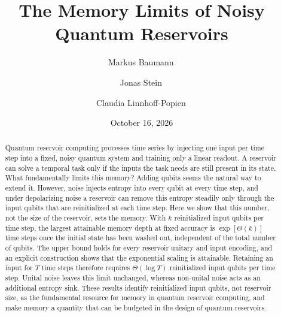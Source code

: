 \documentclass[aps,pra,reprint,superscriptaddress,floatfix]{revtex4-2}
\theoremstyle{plain}
\begin{document}
\raggedbottom

\title{The Memory Limits of Noisy Quantum Reservoirs}

\author{Markus Baumann\,}
\author{Jonas Stein\,}
\author{Claudia Linnhoff-Popien\,}

\date{October 16, 2026}

\begin{abstract}
Quantum reservoir computing processes time series by injecting one input per time step into a fixed, noisy quantum system and training only a linear readout. A reservoir can solve a temporal task only if the inputs the task needs are still present in its state. What fundamentally limits this memory? Adding qubits seems the natural way to extend it. However, noise injects entropy into every qubit at every time step, and under depolarizing noise a reservoir can remove this entropy steadily only through the input qubits that are reinitialized at each time step. Here we show that this number, not the size of the reservoir, sets the memory. With $k$ reinitialized input qubits per time step, the largest attainable memory depth at fixed accuracy is $\exp[\Theta(k)]$ time steps once the initial state has been washed out, independent of the total number of qubits. The upper bound holds for every reservoir unitary and input encoding, and an explicit construction shows that the exponential scaling is attainable. Retaining an input for $T$ time steps therefore requires $\Theta(\log T)$ reinitialized input qubits per time step. Unital noise leaves this limit unchanged, whereas non-unital noise acts as an additional entropy sink. These results identify reinitialized input qubits, not reservoir size, as the fundamental resource for memory in quantum reservoir computing, and make memory a quantity that can be budgeted in the design of quantum reservoirs.
\end{abstract}

\maketitle
\end{document}
